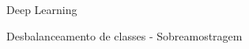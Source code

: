 \documentclass{beamer}
\begin{document}
\begin{frame}{Deep Learning}
\begin{frame}{Desbalanceamento de classes - Sobreamostragem}



\end{frame}
\end{frame}
\end{document}
